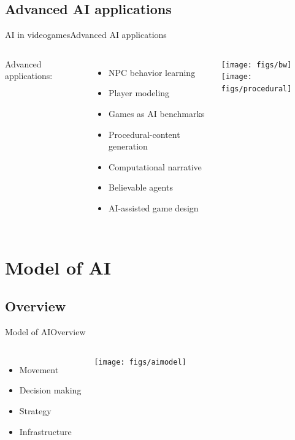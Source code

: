 \documentclass[10pt,compress]{beamer} %
\begin{document}
\subsection{Advanced AI applications}
\begin{frame}{AI in videogames}{Advanced AI applications}
    \begin{columns}
	\vspace{-0.5cm}
	   Advanced applications:
	   \begin{itemize}
			\item NPC behavior learning
			\item Player modeling
			\item Games as AI benchmarks
			\item Procedural-content generation
			\item Computational narrative
			\item Believable agents
			\item AI-assisted game design
		\end{itemize}

	\texttt{[image: figs/bw]}\\
	\texttt{[image: figs/procedural]}
	\end{columns}
\end{frame}


\section{Model of AI}
\subsection{Overview}
\begin{frame}{Model of AI}{Overview}
    \begin{columns}
		\begin{itemize}
		\item Movement
		\item Decision making
		\item Strategy
		\item Infrastructure
		\end{itemize}
		\centering\texttt{[image: figs/aimodel]}\\

	\end{columns}
\end{frame}
\end{document}

